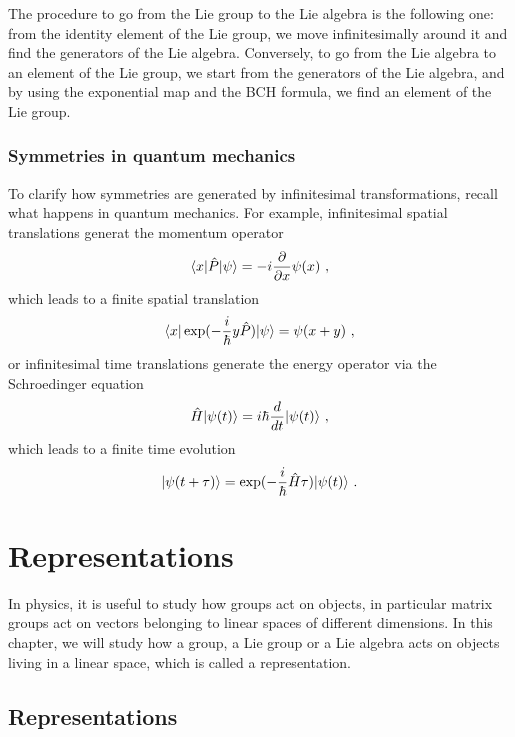     The procedure to go from the Lie group to the Lie algebra is the following one: from the identity element of the Lie group, we move infinitesimally around it and find the generators of the Lie algebra. Conversely, to go from the Lie algebra to an element of the Lie group, we start from the generators of the Lie algebra, and by using the exponential map and the BCH formula, we find an element of the Lie group.

\subsection{Symmetries in quantum mechanics}

    To clarify how symmetries are generated by infinitesimal transformations, recall what happens in quantum mechanics. For example, infinitesimal spatial translations generat the momentum operator 
    \begin{equation*}
        \langle x\vert \hat P \vert\psi\rangle = - i \frac{\partial}{\partial x} \psi(x) ~,
    \end{equation*}
    which leads to a finite spatial translation
    \begin{equation*}
        \langle x\vert \exp(- \frac{i}{\hbar} y \hat P) \vert\psi\rangle = \psi(x + y) ~,
    \end{equation*}
    or infinitesimal time translations generate the energy operator via the Schroedinger equation
    \begin{equation*}
        \hat H \vert\psi(t)\rangle = i \hbar \frac{d}{dt} \vert\psi(t)\rangle ~,
    \end{equation*}
    which leads to a finite time evolution
    \begin{equation*}
        \vert\psi(t + \tau)\rangle = \exp(- \frac{i}{\hbar} \hat H \tau) \vert\psi(t)\rangle ~.
    \end{equation*}
    
\chapter{Representations}

    In physics, it is useful to study how groups act on objects, in particular matrix groups act on vectors belonging to linear spaces of different dimensions. In this chapter, we will study how a group, a Lie group or a  Lie algebra acts on objects living in a linear space, which is called a representation.

\section{Representations}

